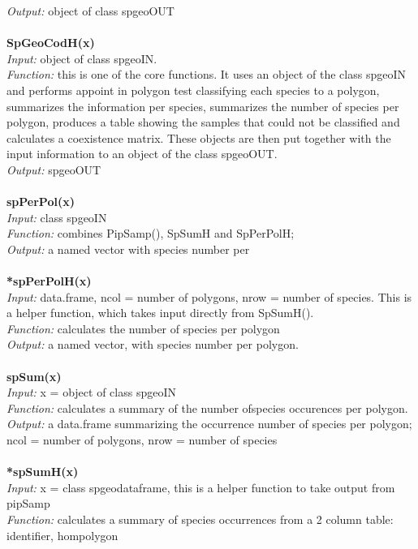 \documentclass[a4paper,titlepage,11pt]{scrreprt}
\begin{document}
\textit{Output:} object of class spgeoOUT\\
\\
\textbf{SpGeoCodH(x)}\\
\textit{Input:} object of class spgeoIN.\\
\textit{Function:} this is one of the core functions. It uses an object of the class spgeoIN and performs appoint in polygon test classifying each species to a polygon, summarizes the information per species, summarizes the number of species per polygon, produces a table  showing the samples that could not be classified and calculates a coexistence matrix. These objects are then put together with the input information to an object of the class spgeoOUT.\\
\textit{Output:} spgeoOUT\\
\\
\textbf{spPerPol(x)}\\
\textit{Input:} class spgeoIN\\
\textit{Function:} combines PipSamp(), SpSumH and SpPerPolH;\\
\textit{Output:} a named vector with species number per \\
\\
\textbf{*spPerPolH(x)}\\
\textit{Input:} data.frame, ncol = number of polygons, nrow = number of species. This is a helper function, which takes input directly from SpSumH().\\
\textit{Function:} calculates the number of species per polygon\\
\textit{Output:} a named vector, with species number per polygon.\\
\\
\textbf{spSum(x)}\\
\textit{Input:} x = object of class spgeoIN\\
\textit{Function:} calculates a summary of the number ofspecies occurences per polygon.\\
\textit{Output:} a data.frame summarizing the occurrence number of species per polygon; ncol = number of polygons, nrow = number of species\\
\\
\textbf{*spSumH(x)}\\
\textit{Input:} x = class spgeodataframe, this is a helper function to take output from pipSamp\\
\textit{Function:} calculates a summary of species occurrences from a 2 column table: identifier, hompolygon\\
\end{document}

